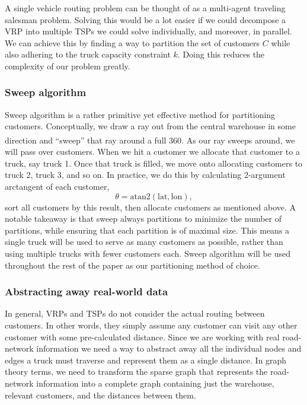 \documentclass[conference]{IEEEtran}
\begin{document}
A single vehicle routing problem can be thought of as a multi-agent traveling salesman problem. Solving this would be a lot easier if we could decompose a VRP into multiple TSPs we could solve individually, and moreover, in parallel. We can achieve this by finding a way to partition the set of customers $C$ while also adhering to the truck capacity constraint $k$. Doing this reduces the complexity of our problem greatly.

\subsubsection{Sweep algorithm}

Sweep algorithm is a rather primitive yet effective method for partitioning customers. Conceptually, we draw a ray out from the central warehouse in some direction and ``sweep'' that ray around a full 360\textsuperscript{\circ}. As our ray sweeps around, we will pass over customers. When we hit a customer we allocate that customer to a truck, say truck 1. Once that truck is filled, we move onto allocating customers to truck 2, truck 3, and so on. In practice, we do this by calculating 2-argument arctangent of each customer,
\[
    \theta=\mathrm{atan2}(\text{lat},\text{lon}),
\]
sort all customers by this result, then allocate customers as mentioned above. A notable takeaway is that sweep always partitions to minimize the number of partitions, while ensuring that each partition is of maximal size. This means a single truck will be used to serve as many customers as possible, rather than using multiple trucks with fewer customers each. Sweep algorithm will be used throughout the rest of the paper as our partitioning method of choice.

\subsubsection{Abstracting away real-world data}

In general, VRPs and TSPs do not consider the actual routing between customers. In other words, they simply assume any customer can visit any other customer with some pre-calculated distance. Since we are working with real road-network information we need a way to abstract away all the individual nodes and edges a truck must traverse and represent them as a single distance. In graph theory terms, we need to transform the sparse graph that represents the road-network information into a complete graph containing just the warehouse, relevant customers, and the distances between them.
\end{document}
